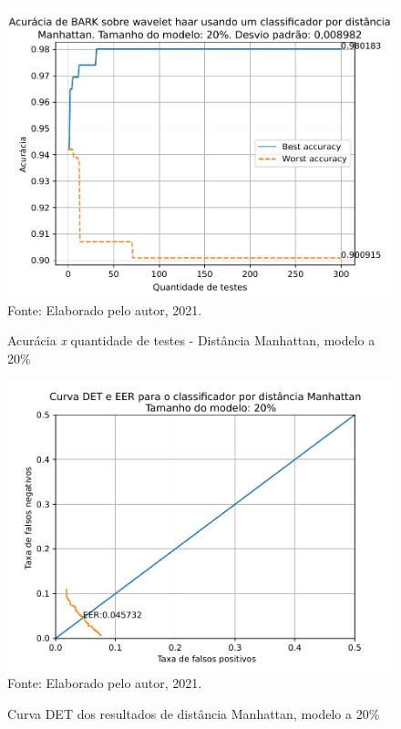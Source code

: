 			\begin{figure}[H]
				\centering
				\caption{Acurácia \textit{x} quantidade de testes - Distância Manhattan, modelo a 20\%}
				\includegraphics[width=.9\linewidth]{images/results/confusionMatrices/classifier_Manhattan_20}
				\label{fig:classifiermanhattan20}
				\\Fonte: Elaborado pelo autor, 2021.
			\end{figure}
		
			\begin{figure}[H]
				\centering
				\caption{Curva DET dos resultados de distância Manhattan, modelo a 20\%}
				\includegraphics[width=.9\linewidth]{images/results/det/DET_for_classifier_Manhattan_20}
				\label{fig:detforclassifiermanhattan20}
				\\Fonte: Elaborado pelo autor, 2021.
			\end{figure}
			
